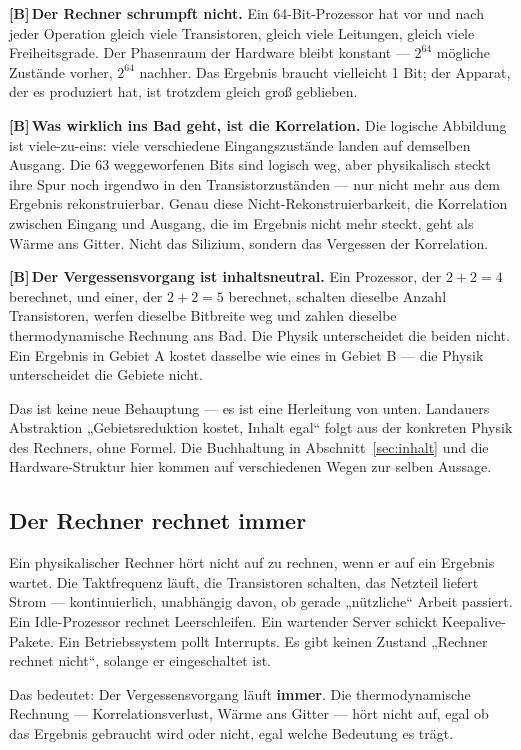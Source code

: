 \documentclass[11pt,a4paper]{article}
\newcommand{\LB}{\textcolor{layB}{\textbf{\footnotesize\textsf{[B]}}}\,}
\begin{document}
\LB \textbf{Der Rechner schrumpft nicht.} Ein 64-Bit-Prozessor hat vor und nach
jeder Operation gleich viele Transistoren, gleich viele Leitungen, gleich viele
Freiheitsgrade. Der Phasenraum der Hardware bleibt konstant --- $2^{64}$ mögliche
Zustände vorher, $2^{64}$ nachher. Das Ergebnis braucht vielleicht 1 Bit; der
Apparat, der es produziert hat, ist trotzdem gleich groß geblieben.

\LB \textbf{Was wirklich ins Bad geht, ist die Korrelation.} Die logische
Abbildung ist viele-zu-eins: viele verschiedene Eingangszustände landen auf
demselben Ausgang. Die 63 weggeworfenen Bits sind logisch weg, aber physikalisch
steckt ihre Spur noch irgendwo in den Transistorzuständen --- nur nicht mehr aus
dem Ergebnis rekonstruierbar. Genau diese Nicht-Rekonstruierbarkeit, die
Korrelation zwischen Eingang und Ausgang, die im Ergebnis nicht mehr steckt, geht
als Wärme ans Gitter. Nicht das Silizium, sondern das Vergessen der Korrelation.

\LB \textbf{Der Vergessensvorgang ist inhaltsneutral.} Ein Prozessor, der
$2+2=4$ berechnet, und einer, der $2+2=5$ berechnet, schalten dieselbe Anzahl
Transistoren, werfen dieselbe Bitbreite weg und zahlen dieselbe thermodynamische
Rechnung ans Bad. Die Physik unterscheidet die beiden nicht. Ein Ergebnis in
Gebiet A kostet dasselbe wie eines in Gebiet B --- die Physik unterscheidet die
Gebiete nicht.

Das ist keine neue Behauptung --- es ist eine Herleitung von unten. Landauers
Abstraktion „Gebietsreduktion kostet, Inhalt egal“ folgt aus der konkreten Physik
des Rechners, ohne Formel. Die Buchhaltung in Abschnitt~\ref{sec:inhalt} und die
Hardware-Struktur hier kommen auf verschiedenen Wegen zur selben Aussage.

\subsection{Der Rechner rechnet immer}
\label{sec:immer}

Ein physikalischer Rechner hört nicht auf zu rechnen, wenn er auf ein Ergebnis
wartet. Die Taktfrequenz läuft, die Transistoren schalten, das Netzteil liefert
Strom --- kontinuierlich, unabhängig davon, ob gerade „nützliche“ Arbeit
passiert. Ein Idle-Prozessor rechnet Leerschleifen. Ein wartender Server schickt
Keepalive-Pakete. Ein Betriebssystem pollt Interrupts. Es gibt keinen Zustand
„Rechner rechnet nicht“, solange er eingeschaltet ist.

Das bedeutet: Der Vergessensvorgang läuft \textbf{immer}. Die thermodynamische
Rechnung --- Korrelationsverlust, Wärme ans Gitter --- hört nicht auf, egal ob das
Ergebnis gebraucht wird oder nicht, egal welche Bedeutung es trägt.
\end{document}
